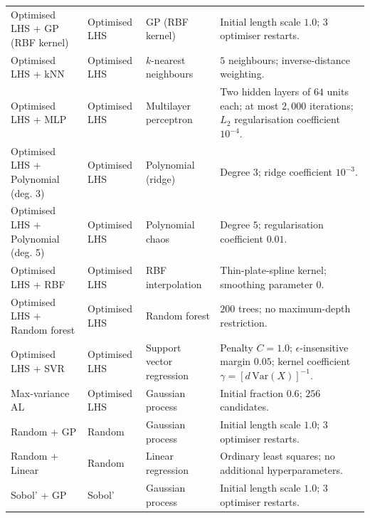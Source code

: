 \begin{longtable}{@{}>{\raggedright\arraybackslash}p{2.8cm}>{\raggedright\arraybackslash}p{1.8cm}>{\raggedright\arraybackslash}p{2.5cm}>{\raggedright\arraybackslash}p{6.3cm}@{}}
Optimised LHS + GP (RBF kernel) & Optimised LHS & GP (RBF kernel) & Initial length scale $1.0$; $3$ optimiser restarts. \\
Optimised LHS + kNN & Optimised LHS & $k$-nearest neighbours & $5$ neighbours; inverse-distance weighting. \\
Optimised LHS + MLP & Optimised LHS & Multilayer perceptron & Two hidden layers of $64$ units each; at most $2{,}000$ iterations; $L_2$ regularisation coefficient $10^{-4}$. \\
Optimised LHS + Polynomial (deg. 3) & Optimised LHS & Polynomial (ridge) & Degree $3$; ridge coefficient $10^{-3}$. \\
Optimised LHS + Polynomial (deg. 5) & Optimised LHS & Polynomial chaos & Degree $5$; regularisation coefficient $0.01$. \\
Optimised LHS + RBF & Optimised LHS & RBF interpolation & Thin-plate-spline kernel; smoothing parameter $0$. \\
Optimised LHS + Random forest & Optimised LHS & Random forest & $200$ trees; no maximum-depth restriction. \\
Optimised LHS + SVR & Optimised LHS & Support vector regression & Penalty $C=1.0$; $\epsilon$-insensitive margin $0.05$; kernel coefficient $\gamma=[d\,\mathrm{Var}(X)]^{-1}$. \\
Max-variance AL & Optimised LHS & Gaussian process & Initial fraction $0.6$; $256$ candidates. \\
Random + GP & Random & Gaussian process & Initial length scale $1.0$; $3$ optimiser restarts. \\
Random + Linear & Random & Linear regression & Ordinary least squares; no additional hyperparameters. \\
Sobol' + GP & Sobol' & Gaussian process & Initial length scale $1.0$; $3$ optimiser restarts. \\
\end{longtable}
\endgroup

